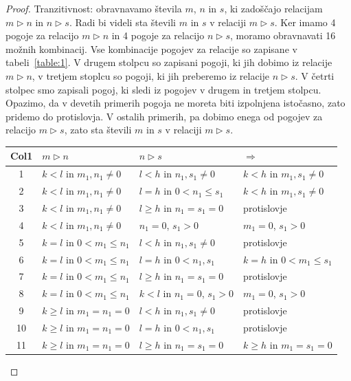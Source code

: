 \documentclass[mat2]{fmfdelo}
\begin{document}
\begin{proof}
Tranzitivnost: obravnavamo števila $m$,  $n$ in $s$, ki zadoščajo relacijam $m \triangleright n$ in $n \triangleright s$. Radi bi videli sta števili $m$ in $s$ v relaciji $m \triangleright s$. Ker imamo 4 pogoje za relacijo $m \triangleright n$ in 4 pogoje za relacijo $n \triangleright s$, moramo obravnavati 16 možnih kombinacij. Vse kombinacije pogojev za relacije so zapisane v tabeli~\ref{table:1}. V drugem stolpcu so zapisani pogoji, ki jih dobimo iz relacije $m \triangleright n$, v tretjem stoplcu so pogoji, ki jih preberemo iz relacije $n \triangleright s$. V četrti stolpec smo zapisali pogoj, ki sledi iz pogojev v drugem in tretjem stolpcu. Opazimo, da v devetih primerih pogoja ne moreta biti izpolnjena istočasno, zato pridemo do protislovja. V ostalih primerih, pa dobimo enega od pogojev za relacijo $m \triangleright s$, zato sta števili $m$ in $s$ v relaciji $m \triangleright s$.
\renewcommand{\arraystretch}{1.2}
\begin{table}[h!]
\centering
\begin{tabular}{||c | l | l | l||} 
 \hline
 Col1 & $m \triangleright n$ & $n \triangleright s$ & $\Rightarrow$ \\ [0.5ex] 
 \hline\hline
 1 & $k<l$ in $m_1, n_1 \neq 0$ & $l<h$ in $n_1, s_1 \neq 0$ & $k<h$ in $m_1, s_1 \neq 0$ \\ 
 2 & $k<l$ in $m_1, n_1 \neq 0$ & $l=h$ in $0<n_1 \leq s_1$ & $k<h$ in $m_1, s_1 \neq 0$ \\
 3 & $k<l$ in $m_1, n_1 \neq 0$ & $l \geq h$ in $n_1 = s_1 = 0$ & protislovje \\
 4 & $k<l$ in $m_1, n_1 \neq 0$ & $n_1 = 0$, $s_1 > 0$ & $m_1 = 0$, $s_1 > 0$ \\
 5 & $k=l$ in $0<m_1 \leq n_1$ & $l<h$ in $n_1, s_1 \neq 0$ & protislovje \\ 
 6 & $k=l$ in $0<m_1 \leq n_1$ & $l=h$ in $0<n_1, s_1$ & $k=h$ in $0<m_1 \leq s_1$ \\
 7 & $k=l$ in $0<m_1 \leq n_1$ & $l \geq h$ in $n_1 = s_1 = 0$ & protislovje \\
 8 & $k=l$ in $0<m_1 \leq n_1$ & $k<l$ in $n_1 = 0$, $s_1 > 0$ & $m_1 = 0$, $s_1 > 0$ \\
 9 & $k \geq l$ in $m_1 = n_1 = 0$ & $l<h$ in $n_1, s_1 \neq 0$ & protislovje \\ 
 10 & $k \geq l$ in $m_1 = n_1 = 0$ & $l=h$ in $0<n_1, s_1$ & protislovje \\
 11 & $k \geq l$ in $m_1 = n_1 = 0$ & $l \geq h$ in $n_1 = s_1 = 0$ & $k \geq h$ in $m_1 = s_1 = 0$ \\

\end{tabular}
\end{table}
\end{proof}
\end{document}
